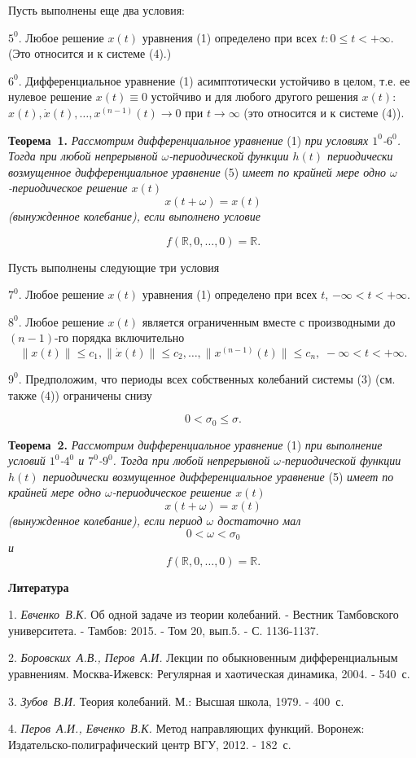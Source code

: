 Пусть выполнены еще  два условия:

$5^0$. Любое решение $x(t)$ уравнения (1)  определено при всех $t:0\leq t< +\infty$.
(Это относится и к системе (4).)

$6^0$. Дифференциальное уравнение (1) асимптотически устойчиво в целом, т.е. ее нулевое решение
$x(t)\equiv 0$ устойчиво и для любого другого решения $x(t)$:
$x(t), \dot x(t),\ldots , x^{(n-1)}(t)\rightarrow 0$ при  $t\rightarrow\infty$ (это относится и к системе (4)).

\textbf{Теорема~1.} {\it Рассмотрим дифференциальное уравнение} (1) {\it при условиях $1^0$-$6^0$. Тогда
	при любой непрерывной $\omega$-периодической функции  $h(t)$ периодически возмущенное дифференциальное
	уравнение} (5) {\it имеет по крайней мере одно $\omega$-периодическое решение  $x(t)$
		$$x(t+\omega)=x(t)$$
	(вынужденное колебание), если выполнено условие}

$$f(\mathbb{ R},0,\ldots,0)=\mathbb{ R}.$$



Пусть выполнены следующие три условия

$7^0$. Любое решение $x(t)$ уравнения (1) определено при всех $t$, $-\infty<t<+\infty$.

$8^0$. Любое решение $x(t)$ является ограниченным вместе с производными до $(n-1)$-го порядка включительно
$$\|x(t)\|\leq c_1, \|\dot{x}(t)\|\leq c_2, \ldots, \|x^{(n-1)}(t)\|\leq c_n,\;  -\infty<t<+\infty.$$

$9^0$. Предположим, что периоды всех собственных колебаний системы (3) (см. также (4)) ограничены снизу

$$ 0<\sigma_0 \leq \sigma. $$

\textbf{Теорема~2.} {\it Рассмотрим дифференциальное уравнение} (1) {\it при выполнение условий $1^0$-$4^0$ и $7^0$-$9^0$. Тогда
	при любой непрерывной  $\omega$-периодической функции  $h(t)$  периодически возмущенное дифференциальное
	уравнение} (5) {\it имеет по крайней мере одно $\omega$-периодическое решение  $x(t)$
		$$x(t+\omega)=x(t) $$
	(вынужденное колебание), если период $\omega$ достаточно мал
		$$0<\omega< \sigma_0 $$
	и}
$$f(\mathbb{ R},0,\ldots,0)=\mathbb{ R}.$$

\smallskip \centerline{\bf Литература}\nopagebreak

1.  {\it Евченко~В.К.} Об одной задаче из теории колебаний.
- Вестник Тамбовского университета. - Тамбов: 2015. - Том 20, вып.5. - С. 1136-1137.

2. {\it Боровских~А.В., Перов~А.И.} Лекции по обыкновенным дифференциальным
уравнениям. Москва-Ижевск: Регулярная и хаотическая динамика, 2004. - 540~с.

3. {\it Зубов~В.И.} Теория колебаний. М.: Высшая школа, 1979. - 400~с.

4. {\it Перов~А.И., Евченко~В.К.} Метод направляющих функций.
Воронеж: Издательско-полиграфический центр ВГУ, 2012. - 182~с.










